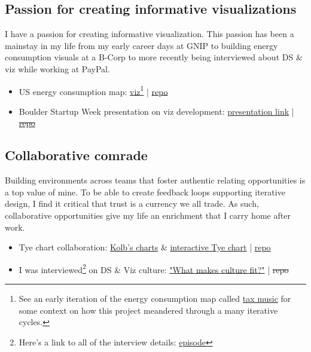 \documentclass[11pt]{article}
\begin{document}
\subsection{Passion for creating informative visualizations}\label{sec:culture}
I have a passion for creating informative visualization. This passion has been a mainstay in my life from my early career days at GNIP to building energy consumption visuals at a B-Corp to more recently being interviewed about DS \& viz while working at PayPal. 

\begin{itemize}
	\item US energy consumption map:  \href{https://blehman.github.io/wmo_map/}{viz}\footnote{See an early iteration of the energy consumption map called \href{https://blehman.github.io/tax_story/tax_sounds/}{tax music} for some context on how this project meandered through a many iterative cycles.} |  \href{https://github.com/blehman/wmo_map/tree/gh-pages}{repo} 
	\item Boulder Startup Week presentation on viz development:  \href{https://blehman.github.io/2015-05-13\_BSW\_DataViz\_Lecture/\#/}{presentation link} | \sout{ \href{https://github.com/blehman/2015-05-13_BSW_DataViz_Lecture/tree/master}{repo} }
\end{itemize}


\subsection{Collaborative comrade}\label{sec:learner}
Building environments across teams that foster authentic relating opportunities is a top value of mine. To be able to create feedback loops supporting iterative design, I find it critical that trust is a currency we all trade. As such, collaborative opportunities give my life an enrichment that I carry home after work.  
 \begin{itemize}
 	\item Tye chart collaboration:  \href{https://github.com/twitterdev/Gnip-Trend-Detection}{Kolb's charts} \& \href{https://blehman.github.io/trend\_detection\_graph/}{interactive Tye chart} | \href{https://github.com/blehman/trend\_detection\_graph}{repo}
	\item I was interviewed\footnote{Here's a link to all of the interview details: \href{https://powderkeg.com/the-power-of-data-science-and-visualization-with-brian-lehman-of-honey/}{episode}} on DS \& Viz culture:  \href{https://www.youtube.com/watch?v=uIOiEL5aUe0&t=20m57s}{"What makes culture fit?"}  | \sout{repo}
 \end{itemize}
\end{document}
